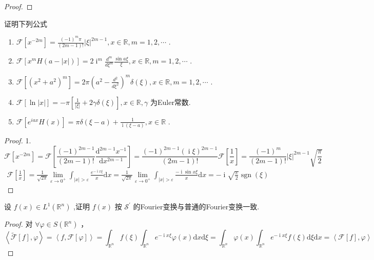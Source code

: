 \documentclass[lang=cn,newtx,10pt,scheme=chinese,thmcnt=chapter]{elegantbook}
\newcommand{\dif}{\mathrm{d}}
\newcommand{\ci}{\operatorname{i}}
\begin{document}
\begin{problemset}
\begin{proof}
\end{proof}
\item 证明下列公式\begin{enumerate}
  \item  \(\mathcal{F}\left\lbrack  {x}^{-{2m}}\right\rbrack   = \frac{{\left( -1\right) }^{m}\pi }{\left( {{2m} - 1}\right) !}{\left| \xi \right| }^{{2m} - 1},x \in  \mathbb{R},m = 1,2,\cdots\) .
  \item \(\mathcal{F}\left\lbrack  {{x}^{m}H\left( {a - \left| x\right| }\right) }\right\rbrack   = 2{\ci}^{m}\frac{{d}^{m}}{d{\xi }^{m}}\frac{\sin {a\xi }}{\xi },x \in  \mathbb{R},m = 1,2,\cdots\) .
  \item \(\mathcal{F}\left\lbrack  {\left( {x}^{2} + {a}^{2}\right) }^{m}\right\rbrack   = {2\pi }{\left( {a}^{2} - \frac{{d}^{2}}{d{\xi }^{2}}\right) }^{m}\delta \left( \xi \right) ,x \in  \mathbb{R},m = 1,2,\cdots\) .
  \item \(\mathcal{F}\left\lbrack  {\ln \left| x\right| }\right\rbrack   =  - \pi \left\lbrack  {\frac{1}{\left| \xi \right| } + {2\gamma \delta }\left( \xi \right) }\right\rbrack  ,x \in  \mathbb{R},\gamma\) 为Euler常数.
  \item \(\mathcal{F}\left\lbrack  {{e}^{iax}H\left( x\right) }\right\rbrack   = {\pi \delta }\left( {\xi  - a}\right)  + \frac{1}{\ci\left( {\xi  - a}\right) },x \in  \mathbb{R}\) .
\end{enumerate}\begin{proof}
    1.\[\mathcal{F}\left\lbrack  {x}^{-{2m}}\right\rbrack =\mathcal{F}\left\lbrack  \frac{(-1)^{2m-1}}{(2m-1)!}\frac{\dif^{2m-1}{x}^{-1}}{\dif x^{2m-1}}\right\rbrack    = \frac{{\left( -1\right) }^{2m-1}(\ci \xi)^{2m-1} }{\left( {{2m} - 1}\right) !}\mathcal{F}\left\lbrack\frac{1}{x}\right\rbrack=\frac{{\left( -1\right) }^{m} }{\left( {{2m} - 1}\right) !}{\left| \xi \right| }^{{2m} - 1}\sqrt{\frac{\pi}{2}}\]
    \begin{equation*}
        \begin{aligned}
        \mathcal{F}\left\lbrack \frac{1}{x}\right\rbrack=\frac{1}{\sqrt{2\pi}}\lim\limits_{\varepsilon\to 0^+}\int_{|x|>\varepsilon}\frac{e^{-\ci x\xi}}{x} \dif x =\frac{1}{\sqrt{2\pi}}\lim\limits_{\varepsilon\to 0^+}\int_{|x|>\varepsilon}\frac{-\ci\sin x\xi}{x} \dif x=-\ci \sqrt{\frac{\pi}{2}}\operatorname{sgn}(\xi)
        \end{aligned}
    \end{equation*}
    
\end{proof}
\item 设 \(f\left( x\right)  \in  {L}^{1}\left( {\mathbb{R}}^{n}\right)\) ,证明 \(f\left( x\right)\) 按 \({\mathcal{S}}^{\prime }\) 的Fourier变换与普通的Fourier变换一致.
\begin{proof}
    对 $\forall \varphi \in S\left(\mathbb{R}^n\right)$ ，
\[\left\langle\widetilde{\mathcal{F}}[f],\varphi\right\rangle=\left\langle f,\mathcal{F}[\varphi]\right\rangle=\int_{\mathbb{R}^n}f(\xi)\int_{\mathbb{R}^n}e^{-\ci x\xi}\varphi(x)\dif x\dif \xi=\int_{\mathbb{R}^n}\varphi(x)\int_{\mathbb{R}^n}e^{-\ci x\xi}f(\xi)\dif \xi\dif x=\left\langle \mathcal{F}[f],\varphi \right\rangle \]


\end{proof}
\end{problemset}
\end{document}
